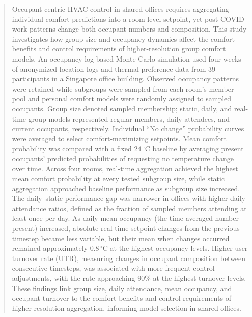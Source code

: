\documentclass[a4paper,fleqn]{cas-sc}
\begin{document}
% 
\begin{abstract}
Occupant-centric HVAC control in shared offices requires aggregating individual comfort predictions into a room-level setpoint, yet post-COVID work patterns change both occupant numbers and composition.
This study investigates how group size and occupancy dynamics affect the comfort benefits and control requirements of higher-resolution group comfort models.
An occupancy-log-based Monte Carlo simulation used four weeks of anonymized location logs and thermal-preference data from 39 participants in a Singapore office building.
Observed occupancy patterns were retained while subgroups were sampled from each room's member pool and personal comfort models were randomly assigned to sampled occupants.
Group size denoted sampled membership; static, daily, and real-time group models represented regular members, daily attendees, and current occupants, respectively.
Individual ``No change'' probability curves were averaged to select comfort-maximizing setpoints.
Mean comfort probability was compared with a fixed $24\,^\circ\mathrm{C}$ baseline by averaging present occupants' predicted probabilities of requesting no temperature change over time.
Across four rooms, real-time aggregation achieved the highest mean comfort probability at every tested subgroup size, while static aggregation approached baseline performance as subgroup size increased.
The daily--static performance gap was narrower in offices with higher daily attendance ratios, defined as the fraction of sampled members attending at least once per day.
As daily mean occupancy (the time-averaged number present) increased, absolute real-time setpoint changes from the previous timestep became less variable, but their mean when changes occurred remained approximately $0.8\,^\circ\mathrm{C}$ at the highest occupancy levels.
Higher user turnover rate (UTR), measuring changes in occupant composition between consecutive timesteps, was associated with more frequent control adjustments, with the rate approaching $90\%$ at the highest turnover levels.
These findings link group size, daily attendance, mean occupancy, and occupant turnover to the comfort benefits and control requirements of higher-resolution aggregation, informing model selection in shared offices.
\end{abstract}

\end{document}
